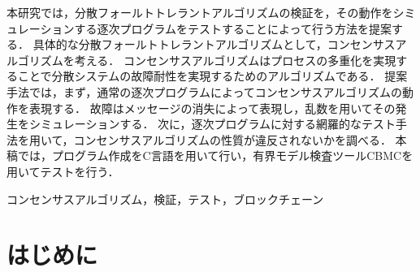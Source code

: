 \documentclass[technicalreport]{ieicej}
\def\IEICEJcls{\texttt{ieicej.cls}}
\def\IEICEJver{3.1}
\theoremstyle{plain}
\begin{document}
\begin{jabstract}

本研究では，分散フォールトトレラントアルゴリズムの検証を，その動作をシミュレーションする逐次プログラムをテストすることによって行う方法を提案する．
具体的な分散フォールトトレラントアルゴリズムとして，コンセンサスアルゴリズムを考える．
コンセンサスアルゴリズムはプロセスの多重化を実現することで分散システムの故障耐性を実現するためのアルゴリズムである．
提案手法では，まず，通常の逐次プログラムによってコンセンサスアルゴリズムの動作を表現する．
故障はメッセージの消失によって表現し，乱数を用いてその発生をシミュレーションする．
次に，逐次プログラムに対する網羅的なテスト手法を用いて，コンセンサスアルゴリズムの性質が違反されないかを調べる．
本稿では，プログラム作成をC言語を用いて行い，有界モデル検査ツールCBMCを用いてテストを行う．
\end{jabstract}
\begin{jkeyword}
	コンセンサスアルゴリズム，検証，テスト，ブロックチェーン
\end{jkeyword}
\maketitle

\section{はじめに}
\end{document}
